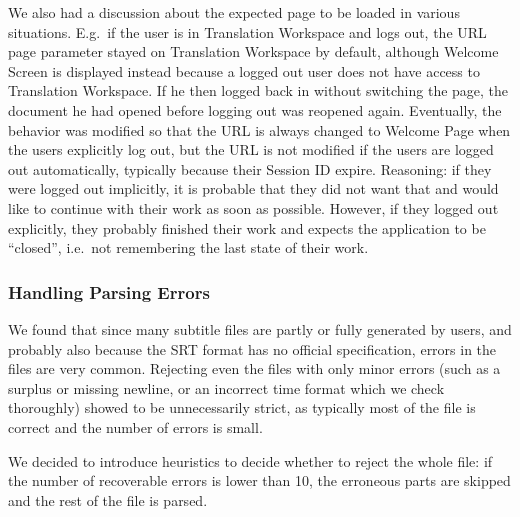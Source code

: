 {%

We also had a discussion about the expected page to be loaded in various situations. E.g.\ if the user is in Translation Workspace and logs out, the URL page parameter stayed on Translation Workspace by default, although Welcome Screen is displayed instead because a logged out user does not have access to Translation Workspace. If he then logged back in without switching the page, the document he had opened before logging out was reopened again.
Eventually, the behavior was modified so that the URL is always changed to Welcome Page when the users explicitly log out, but the URL is not modified if the users are logged out automatically, typically because their Session ID expire. Reasoning: if they were logged out implicitly, it is probable that they did not want that and would like to continue with their work as soon as possible. However, if they logged out explicitly, they probably finished their work and expects the application to be ``closed'', i.e.\ not remembering the last state of their work.


\subsubsection{Handling Parsing Errors}


We found that since many subtitle files are partly or fully generated by users, and probably also because the SRT format has no official specification, errors in the files are very common. Rejecting even the files with only minor errors (such as a surplus or missing newline, or an incorrect time format which we check thoroughly) showed to be unnecessarily strict, as typically most of the file is correct and the number of errors is small.

We decided to introduce heuristics to decide whether to reject the whole file: if the number of recoverable errors is lower than 10, the erroneous parts are skipped and the rest of the file is parsed.



}
